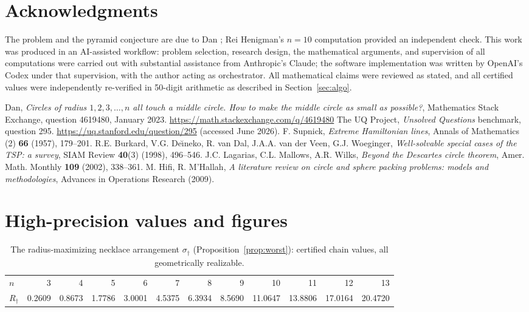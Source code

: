 \documentclass[11pt]{article}
\theoremstyle{definition}
\theoremstyle{remark}
\begin{document}
\section*{Acknowledgments}
The problem and the pyramid conjecture are due to Dan \cite{mse}; Rei Henigman's $n=10$ computation provided an independent check. This work was produced in an AI-assisted workflow: problem selection, research design, the mathematical arguments, and supervision of all computations were carried out with substantial assistance from Anthropic's Claude; the software implementation was written by OpenAI's Codex under that supervision, with the author acting as orchestrator. All mathematical claims were reviewed as stated, and all certified values were independently re-verified in 50-digit arithmetic as described in Section~\ref{sec:algo}.

\begin{thebibliography}{9}
 Dan, \emph{Circles of radius $1,2,3,\dots,n$ all touch a middle circle. How to make the middle circle as small as possible?}, Mathematics Stack Exchange, question 4619480, January 2023. \url{https://math.stackexchange.com/q/4619480}
 The UQ Project, \emph{Unsolved Questions} benchmark, question 295. \url{https://uq.stanford.edu/question/295} (accessed June 2026).
 F. Supnick, \emph{Extreme Hamiltonian lines}, Annals of Mathematics (2) \textbf{66} (1957), 179--201.
 R.E. Burkard, V.G. De\u{\i}neko, R. van Dal, J.A.A. van der Veen, G.J. Woeginger, \emph{Well-solvable special cases of the TSP: a survey}, SIAM Review \textbf{40}(3) (1998), 496--546.
 J.C. Lagarias, C.L. Mallows, A.R. Wilks, \emph{Beyond the Descartes circle theorem}, Amer. Math. Monthly \textbf{109} (2002), 338--361.
 M. Hifi, R. M'Hallah, \emph{A literature review on circle and sphere packing problems: models and methodologies}, Advances in Operations Research (2009).
\end{thebibliography}

\appendix
\section{High-precision values and figures}
\begin{table}[ht]\centering
\caption{The radius-maximizing necklace arrangement $\sigma_\dagger$ (Proposition~\ref{prop:worst}): certified chain values, all geometrically realizable.}
\label{tab:worst}
\small
\begin{tabular}{lrrrrrrrrrrr}
\toprule
$n$ & 3 & 4 & 5 & 6 & 7 & 8 & 9 & 10 & 11 & 12 & 13 \\
$R_\dagger$ & 0.2609 & 0.8673 & 1.7786 & 3.0001 & 4.5375 & 6.3934 & 8.5690 & 11.0647 & 13.8806 & 17.0164 & 20.4720 \\
\bottomrule
\end{tabular}
\end{table}
\end{document}

